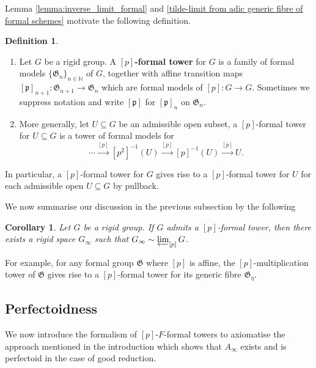 \documentclass[10pt,oneside]{amsart}
\newtheorem{corollary}[theorem]{Corollary}
\theoremstyle{definition}
\newtheorem{definition}[theorem]{Definition}
\begin{document}
	Lemma \ref{lemma:inverse_limit_formal} and  \ref{tilde-limit from adic generic fibre of formal schemes} motivate the following definition. 
	\begin{definition}  \indent 
	
	\begin{enumerate}
	\item	Let $G$ be a rigid group. A \textbf{$[p]$-formal tower} for $G$ is  a family of formal models $\{\mathfrak G_n\}_{n\in \mathbb N}$ of $G$, together with affine transition maps $[\mathfrak p]_{n+1}:\mathfrak G_{n+1}\rightarrow \mathfrak G_{n}$ which are formal models of $[p]:G\rightarrow G$. Sometimes we suppress notation and write $[\mathfrak p]$ for $[\mathfrak p]_{n}$ on $\mathfrak G_n$. 
	\item	 More generally, let $U\subseteq G$ be an admissible open subset, a $[p]$-formal tower for $U \subseteq G$ is a tower of formal models for 
$$ \cdots \xrightarrow{[p]} [p^2]^{-1} (U)   \xrightarrow{[p]} [p]^{-1} (U)  \xrightarrow{[p]} U. $$  
	\end{enumerate}
	\end{definition}
	

In particular, a $[p]$-formal tower for $G$ gives rise to a $[p]$-formal tower for $U$ for each admissible open $U \subseteq G$ by pullback. 

 
	
	We now summarise our discussion in the previous subsection by the following
	\begin{corollary}
		Let $G$ be a rigid group. If $G$ admits a $[p]$-formal tower, then there exists a rigid space $G_\infty$ such that $G_\infty \sim \varprojlim_{[p]}G$.
	\end{corollary}
	For example, for any formal group $\mathfrak G$ where $[p]$ is affine, the $[p]$-multiplication tower of $\mathfrak G$ gives rise to a $[p]$-formal tower for its generic fibre $\mathfrak G_\eta$. 
	
	
	
	
	\subsection{Perfectoidness}  \label{subsection:perfectoid_tilde_limit}

We now introduce the formalism of $[p]$-$F$-formal towers to axiomatise the approach mentioned in the introduction which shows that $A_\infty$ exists and is perfectoid in the case of good reduction.
	
\end{document}
